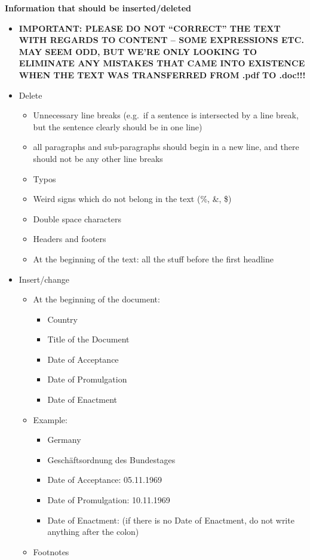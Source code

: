 \documentclass[10pt,]{article}
\providecommand{\tightlist}{%
  \setlength{\itemsep}{0pt}\setlength{\parskip}{0pt}}
\begin{document}
\textbf{Information that should be inserted/deleted}

\begin{itemize}
\tightlist
\item
  \textbf{IMPORTANT: PLEASE DO NOT ``CORRECT'' THE TEXT WITH REGARDS TO
  CONTENT -- SOME EXPRESSIONS ETC. MAY SEEM ODD, BUT WE'RE ONLY LOOKING
  TO ELIMINATE ANY MISTAKES THAT CAME INTO EXISTENCE WHEN THE TEXT WAS
  TRANSFERRED FROM .pdf TO .doc!!!}
\item
  Delete

  \begin{itemize}
  \tightlist
  \item
    Unnecessary line breaks (e.g.~if a sentence is intersected by a line
    break, but the sentence clearly should be in one line)
  \item
    all paragraphs and sub-paragraphs should begin in a new line, and
    there should not be any other line breaks
  \item
    Typos
  \item
    Weird signs which do not belong in the text (\%, \&, \$)
  \item
    Double space characters
  \item
    Headers and footers
  \item
    At the beginning of the text: all the stuff before the first
    headline
  \end{itemize}
\item
  Insert/change

  \begin{itemize}
  \tightlist
  \item
    At the beginning of the document:

    \begin{itemize}
    \tightlist
    \item
      Country
    \item
      Title of the Document
    \item
      Date of Acceptance
    \item
      Date of Promulgation
    \item
      Date of Enactment
    \end{itemize}
  \item
    Example:

    \begin{itemize}
    \tightlist
    \item
      Germany
    \item
      Geschäftsordnung des Bundestages
    \item
      Date of Acceptance: 05.11.1969
    \item
      Date of Promulgation: 10.11.1969
    \item
      Date of Enactment: (if there is no Date of Enactment, do not write
      anything after the colon)
    \end{itemize}
  \item
    Footnotes


\end{itemize}
\end{itemize}
\end{document}

